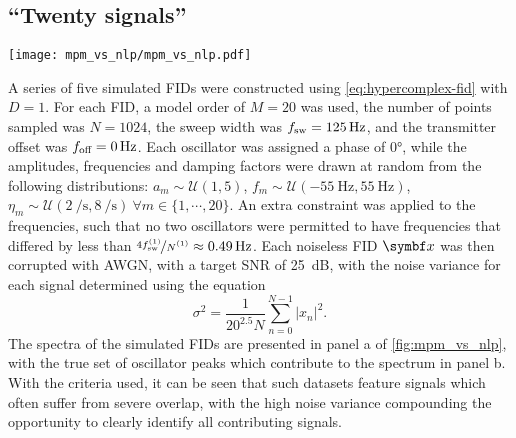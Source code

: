 \subsection{``Twenty signals''}
\begin{sidewaysfigure}
    \centering
    \texttt{[image: mpm\_vs\_nlp/mpm\_vs\_nlp.pdf]}
    \caption[
        The result of estimating a series of 5 simulated signals comprising 20
        oscillators, using solely the \acs{MPM} and also with phase
        variance-regularised \acs{NLP} afterwards.
    ]{
        The result of estimating a series of 5 simulated signals comprising 20
        oscillators (see the main text for details on how the datasets were constructed).
        \textbf{a.} Spectra of the datasets generated.
        \textbf{b.} Spectral lines corresponding to the true set of oscillators
        used to generate each dataset.
        \textbf{c.} Plots of peaks for each oscillator generated using
        the \acs{MPM}.
        \textbf{d.} An equivalent plot for the result after applying \acs{NLP},
        with the \acs{MPM} result being the initial guess.
        Also included in \textbf{c.} and \textbf{d.} is the residual between the
        data and the sum of the oscillator peaks (grey line).
        The colouring of oscillator lines in \textbf{c.} and \textbf{d.} is
        described in the main text.
    }
    \label{fig:mpm_vs_nlp}
\end{sidewaysfigure}
A series of five simulated \acp{FID} were constructed using
\cref{eq:hypercomplex-fid} with $D=1$. For each \ac{FID}, a model order
of $M=20$ was used, the number of points sampled was $N = 1024$, the sweep
width was $f_{\mathrm{sw}}=\qty{125}{\hertz}$, and the transmitter offset was $f_{\text{off}}
= \qty{0}{\hertz}$.  Each oscillator was assigned a phase of \ang{0}, while the
amplitudes, frequencies and damping factors were drawn at random from the
following distributions:
$a_m \sim \mathcal{U}(1, 5)$, $f_m \sim \mathcal{U}(\qty{-55}{\hertz},
\qty{55}{\hertz})$, $\eta_m \sim \mathcal{U}(\qty{2}{\per\second},
\qty{8}{\per\second})\ \forall m \in \lbrace 1, \cdots, 20\rbrace$. An extra
constraint was applied to the frequencies,
such that no two oscillators were permitted to have frequencies that differed
by less than $\nicefrac{4 \fswone}{\None} \approx \qty{0.49}{\hertz}$. Each
noiseless \ac{FID} $\bx$ was then corrupted with \ac{AWGN}, with a target
\ac{SNR} of \qty{25}{\deci\bel}, with the noise variance for each signal
determined using the equation
\begin{equation}
    \sigma^2 = \frac{1}{20^{2.5} N}
        \sum_{n=0}^{N-1} \lvert x_n \rvert^2.
\end{equation}
The spectra of the simulated \acp{FID} are presented in panel a of
\cref{fig:mpm_vs_nlp}, with the true set of oscillator peaks which contribute
to the spectrum in panel b. With the criteria used, it can be seen that such
datasets feature signals which often suffer from severe overlap, with the high
noise variance compounding the opportunity to clearly identify all contributing
signals.

